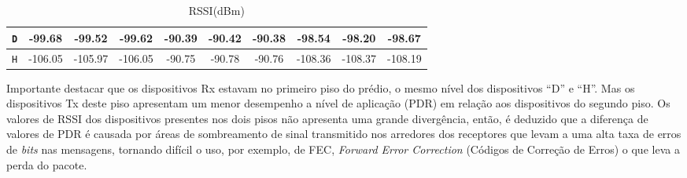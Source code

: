 \begin{table}
\begin{subtable}{\textwidth}
\begin{center}
\begin{tabular}{|c|c|c|c|c|c|c|c|c|c|}
                        \texttt{D} & -99.68                                & -99.52                                  & -99.62                                 & -90.39         & -90.42         & -90.38         & -98.54         & -98.20         & -98.67         \\ \hline
                        \texttt{H} & -106.05                               & -105.97                                 & -106.05                                & -90.75         & -90.78         & -90.76         & -108.36        & -108.37        & -108.19        \\ \hline
                  \end{tabular}
                  \caption{RSSI(dBm)}
                  \label{table:rssi1}
            \end{center}
      \end{subtable}%
      \label{tab:table1}
\end{table}

Importante destacar que os dispositivos Rx estavam no primeiro piso do prédio, o mesmo nível dos dispositivos ``D'' e ``H''. Mas os dispositivos Tx deste piso apresentam um menor desempenho a nível de aplicação (PDR) em relação aos dispositivos do segundo piso. Os valores de RSSI dos dispositivos presentes nos dois pisos não apresenta uma grande divergência, então, é deduzido que a diferença de valores de PDR é causada por áreas de sombreamento de sinal transmitido nos arredores dos receptores que levam a uma alta taxa de erros de \emph{bits} nas mensagens, tornando difícil o uso, por exemplo, de FEC, \emph{Forward Error Correction} (Códigos de Correção de Erros) o que leva a perda do pacote.

